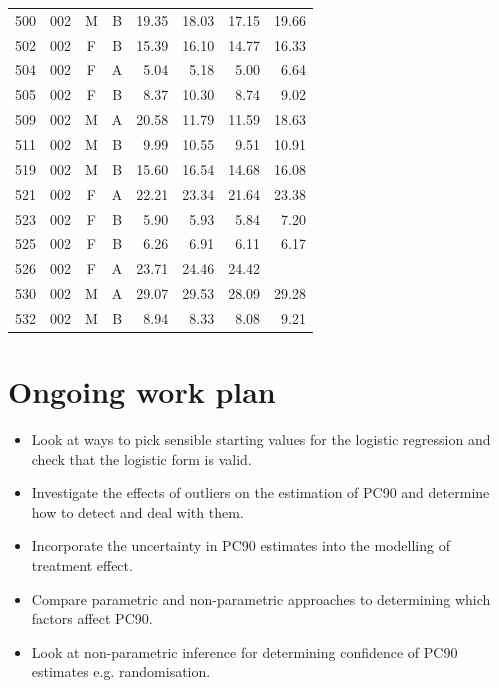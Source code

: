 \begin{table}
\begin{tabular}{|cccc|rrrr|}
500&002&M&B&19.35&18.03&17.15&19.66\\
502&002&F&B&15.39&16.10&14.77&16.33\\
504&002&F&A&5.04&5.18&5.00&6.64\\
505&002&F&B&8.37&10.30&8.74&9.02\\
509&002&M&A&20.58&11.79&11.59&18.63\\
511&002&M&B&9.99&10.55&9.51&10.91\\
519&002&M&B&15.60&16.54&14.68&16.08\\
521&002&F&A&22.21&23.34&21.64&23.38\\
523&002&F&B&5.90&5.93&5.84&7.20\\
525&002&F&B&6.26&6.91&6.11&6.17\\
526&002&F&A&23.71&24.46&24.42&\\
530&002&M&A&29.07&29.53&28.09&29.28\\
532&002&M&B&8.94&8.33&8.08&9.21\\
\hline
\end{tabular}
\end{table}
\section{Ongoing work plan}
\begin{itemize}
\item Look at ways to pick sensible starting values for the logistic regression and check that the logistic form is valid.
\item Investigate the effects of outliers on the estimation of PC90 and determine how to detect and deal with them.
\item Incorporate the uncertainty in PC90 estimates into the modelling of treatment effect. 
\item Compare parametric and non-parametric approaches to determining which factors affect PC90.
\item Look at non-parametric inference for determining confidence of PC90 estimates e.g. randomisation.
\end{itemize}